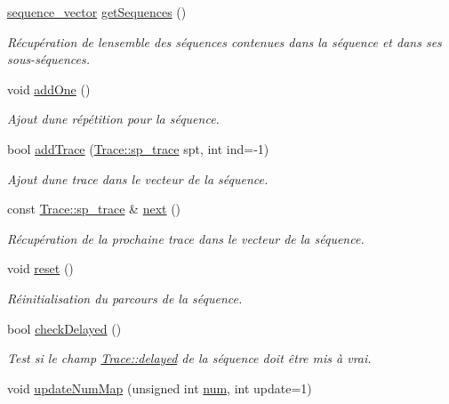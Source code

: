 \begin{DoxyCompactItemize}
\hyperlink{class_sequence_a4487def8096371d361c6099c2d46dd13}{sequence\+\_\+vector} \hyperlink{class_sequence_a066802ba99f1fd93fff062d1b54ca985}{get\+Sequences} ()
\begin{DoxyCompactList}\small\item\em Récupération de l\textquotesingle{}ensemble des séquences contenues dans la séquence et dans ses sous-\/séquences. \end{DoxyCompactList}\item 
void \hyperlink{class_sequence_a901736e6e3f64dcb3a4c12892bc5dc92}{add\+One} ()
\begin{DoxyCompactList}\small\item\em Ajout d\textquotesingle{}une répétition pour la séquence. \end{DoxyCompactList}\item 
bool \hyperlink{class_sequence_a74e000d0651eb8d4c7bfd20032440c07}{add\+Trace} (\hyperlink{class_trace_a9c58e523529fc8a03fb6acf3eef86150}{Trace\+::sp\+\_\+trace} spt, int ind=-\/1)
\begin{DoxyCompactList}\small\item\em Ajout d\textquotesingle{}une trace dans le vecteur de la séquence. \end{DoxyCompactList}\item 
const \hyperlink{class_trace_a9c58e523529fc8a03fb6acf3eef86150}{Trace\+::sp\+\_\+trace} \& \hyperlink{class_sequence_a5c6f4d1232eb3fddc256a2d654c48c6b}{next} ()
\begin{DoxyCompactList}\small\item\em Récupération de la prochaine trace dans le vecteur de la séquence. \end{DoxyCompactList}\item 
void \hyperlink{class_sequence_af1dbfa6630d8224407b489658f3cae13}{reset} ()
\begin{DoxyCompactList}\small\item\em Réinitialisation du parcours de la séquence. \end{DoxyCompactList}\item 
bool \hyperlink{class_sequence_a4332a20962a5bda02bba87789c06490d}{check\+Delayed} ()
\begin{DoxyCompactList}\small\item\em Test si le champ \hyperlink{class_trace_a9757057cc65f9e45bbeaa848cb06d5a1}{Trace\+::delayed} de la séquence doit être mis à vrai. \end{DoxyCompactList}\item 
void \hyperlink{class_sequence_a3cbca7f0a868e768d112e61f2087cbae}{update\+Num\+Map} (unsigned int \hyperlink{class_sequence_a9283bd1da021b06eeaed1028b1e7069e}{num}, int update=1)

\end{DoxyCompactItemize}
